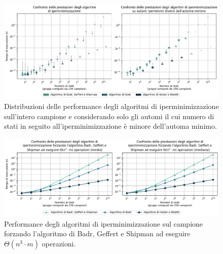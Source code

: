 \documentclass[a4paper,12pt,twoside, openright]{report} %
\begin{document}
\begin{figure}[!htb]
  \centering
  \includegraphics[width=1\linewidth]{images/performance_violin.png}
  \caption{\label{fig:dfa-pcomparison-violin}Distribuzioni delle performance degli algoritmi di iperminimizzazione sull'intero
  campione e considerando solo gli automi il cui numero di stati in seguito all'iperminimizzazione
  è minore dell'automa minimo.}
\end{figure}

\begin{figure}[!htb]
  \centering
  \includegraphics[width=1\linewidth]{images/performance_forced_all_line.png}
  \caption{\label{fig:dfa-pcomparison-all-forced-lines}Performance degli algoritmi di iperminimizzazione sul
  campione forzando l'algoritmo di Badr, Geffert e Shipman ad eseguire $\Theta(n^3 \cdot m)$ operazioni.}
\end{figure}
\end{document}
